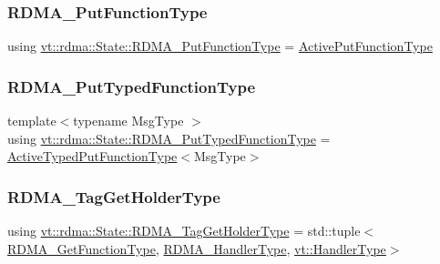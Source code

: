 \subsubsection{\texorpdfstring{R\+D\+M\+A\+\_\+\+Put\+Function\+Type}{RDMA\_PutFunctionType}}
{\footnotesize\ttfamily using \hyperlink{structvt_1_1rdma_1_1_state_aa43a5d043fe01086818e9c5c364341d4}{vt\+::rdma\+::\+State\+::\+R\+D\+M\+A\+\_\+\+Put\+Function\+Type} =  \hyperlink{namespacevt_1_1rdma_a9adc598d6d34e2ed3c143711992674d8}{Active\+Put\+Function\+Type}}

\mbox{\label{structvt_1_1rdma_1_1_state_a3f76d1ccdab20ed3091e36d8fb9ecda5}} 
\subsubsection{\texorpdfstring{R\+D\+M\+A\+\_\+\+Put\+Typed\+Function\+Type}{RDMA\_PutTypedFunctionType}}
{\footnotesize\ttfamily template$<$typename Msg\+Type $>$ \\
using \hyperlink{structvt_1_1rdma_1_1_state_a3f76d1ccdab20ed3091e36d8fb9ecda5}{vt\+::rdma\+::\+State\+::\+R\+D\+M\+A\+\_\+\+Put\+Typed\+Function\+Type} =  \hyperlink{namespacevt_1_1rdma_a56f7eb7ecfa7e6824d3abb4afb634a37}{Active\+Typed\+Put\+Function\+Type}$<$Msg\+Type$>$}

\mbox{\label{structvt_1_1rdma_1_1_state_a10b0ce4a13ce643ca2a944dd05c601ff}} 
\subsubsection{\texorpdfstring{R\+D\+M\+A\+\_\+\+Tag\+Get\+Holder\+Type}{RDMA\_TagGetHolderType}}
{\footnotesize\ttfamily using \hyperlink{structvt_1_1rdma_1_1_state_a10b0ce4a13ce643ca2a944dd05c601ff}{vt\+::rdma\+::\+State\+::\+R\+D\+M\+A\+\_\+\+Tag\+Get\+Holder\+Type} =  std\+::tuple$<$\hyperlink{structvt_1_1rdma_1_1_state_af0baaa6ac5c3b7b256d032f2ee845676}{R\+D\+M\+A\+\_\+\+Get\+Function\+Type}, \hyperlink{namespacevt_a9530efb893c0f3846e8ac5f0507e0f49}{R\+D\+M\+A\+\_\+\+Handler\+Type}, \hyperlink{namespacevt_af64846b57dfcaf104da3ef6967917573}{vt\+::\+Handler\+Type}$>$}

